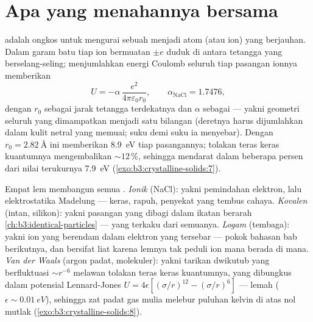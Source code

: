 \section{Apa yang menahannya bersama}

\begin{proposition}\label{prop:b3:crystalline-solids:madelung}
\emph{} adalah ongkos untuk mengurai sebuah 
menjadi atom (atau ion) yang berjauhan. Dalam garam batu tiap ion bermuatan
$\pm e$ duduk di antara tetangga yang berselang-seling; menjumlahkan
energi Coulomb seluruh  tiap pasangan ionnya memberikan
\[
U = -\alpha\,\frac{e^2}{4\pi\varepsilon_0 r_0} ,
\qquad \alpha_{\text{NaCl}} = 1.7476 ,
\]
dengan $r_0$ sebagai jarak tetangga terdekatnya dan $\alpha$ sebagai
\emph{} --- yakni geometri seluruh  yang
dimampatkan menjadi satu bilangan (deretnya harus dijumlahkan dalam
kulit netral yang memuai; suku demi suku ia menyebar). Dengan $r_0 =
\qty{2.82}{\angstrom}$ ini memberikan \qty{8.9}{eV} tiap pasangannya;
tolakan teras keras kuantumnya mengembalikan $\sim12\,\%$, sehingga
mendarat dalam beberapa persen dari nilai terukurnya \qty{7.9}{eV}
(\cref{exo:b3:crystalline-solids:7}).
\end{proposition}
\admitted

\begin{remark}\label{rem:b3:crystalline-solids:bonds}
%
Empat lem membangun semua . \emph{Ionik} (NaCl): yakni pemindahan
elektron, lalu elektrostatika Madelung --- keras, rapuh, penyekat yang
tembus cahaya. \emph{Kovalen} (intan, silikon): yakni pasangan yang
dibagi dalam ikatan berarah
\cref{ch:b3:identical-particles} --- yang terkaku dari semuanya.
\emph{Logam} (tembaga): yakni ion yang berendam dalam elektron yang
tersebar --- pokok bahasan bab berikutnya, dan bersifat liat karena
lemnya tak peduli ion mana berada di mana. \emph{Van der Waals} (argon
padat,  molekuler): yakni tarikan dwikutub yang berfluktuasi
$\sim r^{-6}$ melawan tolakan teras keras kuantumnya, yang dibungkus
dalam potensial Lennard-Jones
$U = 4\epsilon[(\sigma/r)^{12} - (\sigma/r)^6]$ --- lemah
($\epsilon \sim \qty{0.01}{eV}$), sehingga zat padat gas mulia melebur
puluhan kelvin di atas nol mutlak
(\cref{exo:b3:crystalline-solids:8}).
\end{remark}

